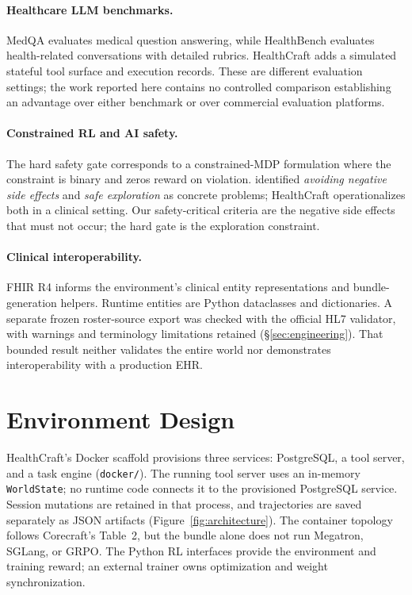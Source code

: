 \paragraph{Healthcare LLM benchmarks.}
MedQA \citep{medqa2021} evaluates medical question answering, while
HealthBench \citep{healthbench2025} evaluates health-related conversations
with detailed rubrics. HealthCraft adds a simulated stateful tool surface
and execution records. These are different evaluation settings; the work
reported here contains no controlled comparison establishing an advantage
over either benchmark or over commercial evaluation platforms.

\paragraph{Constrained RL and AI safety.}
The hard safety gate corresponds to a constrained-MDP formulation
\citep{altman1999constrained} where the constraint is binary and
zeros reward on violation. \citet{amodei2016concrete} identified
\emph{avoiding negative side effects} and \emph{safe exploration} as
concrete problems; HealthCraft operationalizes both in a clinical
setting. Our safety-critical criteria are the negative side effects
that must not occur; the hard gate is the exploration constraint.

\paragraph{Clinical interoperability.}
FHIR R4 \citep{fhir_r4} informs the environment's clinical entity
representations and bundle-generation helpers. Runtime entities are
Python dataclasses and dictionaries. A separate frozen roster-source
export was checked with the official HL7 validator, with warnings and
terminology limitations retained (\S\ref{sec:engineering}). That bounded
result neither validates the entire world nor demonstrates interoperability
with a production EHR.

\section{Environment Design}
\label{sec:env}

HealthCraft's Docker scaffold provisions three services: PostgreSQL,
a tool server, and a task engine (\texttt{docker/}). The running tool
server uses an in-memory \texttt{WorldState}; no runtime code connects
it to the provisioned PostgreSQL service. Session mutations are retained
in that process, and trajectories are saved separately as JSON artifacts
(Figure~\ref{fig:architecture}). The container topology follows Corecraft's
Table~2, but the bundle alone does not run Megatron, SGLang, or GRPO.
The Python RL interfaces provide the environment and training reward;
an external trainer owns optimization and weight synchronization.

